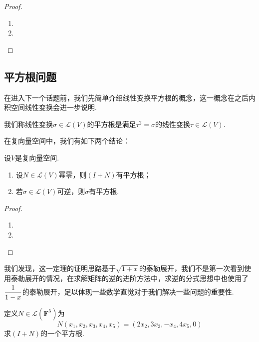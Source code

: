\begin{proof}
    \begin{enumerate}
        \item

        \item
    \end{enumerate}
\end{proof}

\subsection{平方根问题}

在进入下一个话题前，我们先简单介绍线性变换平方根的概念，这一概念在之后内积空间线性变换会进一步说明.
\begin{definition}
    我们称线性变换$\sigma\in \mathcal{L}(V)$的平方根是满足$\tau^2=\sigma$的线性变换$\tau\in \mathcal{L}(V)$.
\end{definition}
在复向量空间中，我们有如下两个结论：
\begin{theorem} \label{thm:16:幂零平方根}
    设$V$是复向量空间.
    \begin{enumerate}
        \item 设$N\in \mathcal{L}(V)$幂零，则$(I+N)$有平方根；

        \item \label{item:16:幂零平方根:2}
              若$\sigma\in \mathcal{L}(V)$可逆，则$\sigma$有平方根.
    \end{enumerate}
\end{theorem}

\begin{proof}
    \begin{enumerate}
        \item

        \item
    \end{enumerate}
\end{proof}

我们发现，这一定理的证明思路基于$\sqrt{1+x}$的泰勒展开，我们不是第一次看到使用泰勒展开的情况，在求解矩阵的逆的进阶方法中，求逆的分式思想中也使用了 $\vphantom{\cfrac{1}{1-x}}\dfrac{1}{1-x}$的泰勒展开，足以体现一些数学直觉对于我们解决一些问题的重要性.

\begin{example}
    定义$N\in \mathcal{L}(\mathbf{F}^5)$为
    \[N(x_1,x_2,x_3,x_4,x_5)=(2x_2,3x_3,-x_4,4x_5,0)\]
    求$(I+N)$的一个平方根.
\end{example}


